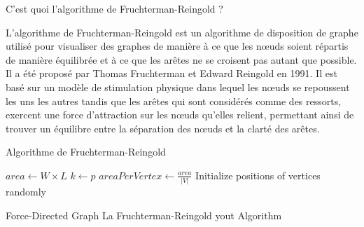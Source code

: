 \documentclass[12pt]{article}
\begin{document}
C'est quoi l'algorithme de Fruchterman-Reingold ? \newline

   L'algorithme de Fruchterman-Reingold est un algorithme de disposition de graphe utilisé pour visualiser des graphes de manière à ce que les nœuds soient répartis de manière équilibrée et à ce que les arêtes ne se croisent pas autant que possible. Il a été proposé par Thomas Fruchterman et Edward Reingold en 1991. 
Il est basé sur un modèle de stimulation physique dans lequel les nœuds se repoussent les uns les autres tandis que les arêtes qui sont considérés comme des ressorts, exercent une force d'attraction sur les nœuds qu'elles relient, permettant ainsi de trouver un équilibre entre la séparation des nœuds et la clarté des arêtes.

\vspace{12pt plus 5pt minus 5pt}

Algorithme de Fruchterman-Reingold  \newline

\begin{algorithm}[H]
  \SetAlgoLined

  $area \leftarrow W \times L$\;
  $k \leftarrow p$\;
  $areaPerVertex \leftarrow \frac{area}{|V|}$\;
  Initialize positions of vertices randomly\;
  \caption{Force-Directed Graph La Fruchterman-Reingold  \newline
yout Algorithm}
\end{algorithm}
\end{document}
